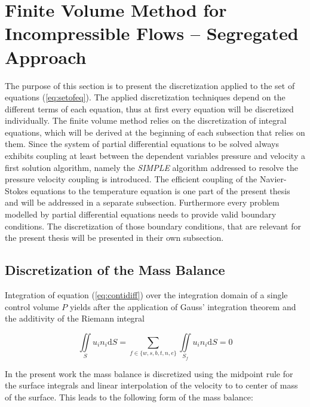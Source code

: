   \section{Finite Volume Method for Incompressible Flows -- Segregated Approach}

  The purpose of this section is to present the discretization applied to the set of equations (\ref{eq:setofeq}). The applied discretization techniques depend on the different terms of each equation, thus at first every equation will be discretized individually. The finite volume method relies on the discretization of integral equations, which will be derived at the beginning of each subsection that relies on them. Since the system of partial differential equations to be solved always exhibits coupling at least between the dependent variables pressure and velocity a first solution algorithm, namely the \textit{SIMPLE} algorithm addressed to resolve the pressure velocity coupling is introduced. The efficient coupling of the Navier-Stokes equations to the temperature equation is one part of the present thesis and will be addressed in a separate subsection. Furthermore every problem modelled by partial differential equations needs to provide valid boundary conditions. The discretization of those boundary conditions, that are relevant for the present thesis will be presented in their own subsection.

    \subsection{Discretization of the Mass Balance}

    Integration of equation (\ref{eq:contidiff}) over the integration domain of a single control volume \(P\) yields after the application of Gauss' integration theorem and the additivity of the Riemann integral

    \begin{displaymath}
      \iint\limits_S  u_i n_i \mathrm{d}S = \sum_{f \in \{w,s,b,t,n,e\}} \iint\limits_{S_f}  u_i n_{i} \mathrm{d}S = 0
    \end{displaymath}

    In the present work the mass balance is discretized using the midpoint rule for the surface integrals and linear interpolation of the velocity to to center of mass of the surface. This leads to the following form of the mass balance: 


